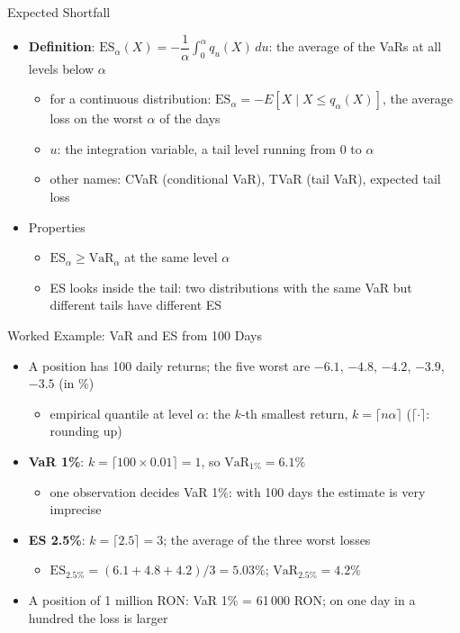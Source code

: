 \begin{frame}{Expected Shortfall}
\itemsize{\small}
\begin{itemize}
    \item \textbf{Definition}: $\mathrm{ES}_\alpha(X) = -\dfrac{1}{\alpha}\displaystyle\int_0^\alpha q_u(X)\,du$: the average of the VaRs at all levels below $\alpha$
    \begin{itemize}
        \item for a continuous distribution: $\mathrm{ES}_\alpha = -E[X \mid X \le q_\alpha(X)]$, the average loss on the worst $\alpha$ of the days
        \item $u$: the integration variable, a tail level running from 0 to $\alpha$
        \item other names: CVaR (conditional VaR), TVaR (tail VaR), expected tail loss
    \end{itemize}
    \item Properties
    \begin{itemize}
        \item $\mathrm{ES}_\alpha \ge \mathrm{VaR}_\alpha$ at the same level $\alpha$
        \item ES looks inside the tail: two distributions with the same VaR but different tails have different ES
    \end{itemize}
\end{itemize}
\end{frame}

\begin{frame}{Worked Example: VaR and ES from 100 Days}
\itemsize{\small}
\begin{itemize}
    \item A position has 100 daily returns; the five worst are $-6.1$, $-4.8$, $-4.2$, $-3.9$, $-3.5$ (in \%)
    \begin{itemize}
        \item empirical quantile at level $\alpha$: the $k$-th smallest return, $k = \lceil n\alpha \rceil$ ($\lceil\cdot\rceil$: rounding up)
    \end{itemize}
    \item \textbf{VaR 1\%}: $k = \lceil 100 \times 0.01 \rceil = 1$, so $\mathrm{VaR}_{1\%} = 6.1\%$
    \begin{itemize}
        \item one observation decides VaR 1\%: with 100 days the estimate is very imprecise
    \end{itemize}
    \item \textbf{ES 2.5\%}: $k = \lceil 2.5 \rceil = 3$; the average of the three worst losses
    \begin{itemize}
        \item $\mathrm{ES}_{2.5\%} = (6.1 + 4.8 + 4.2)/3 = 5.03\%$; $\mathrm{VaR}_{2.5\%} = 4.2\%$
    \end{itemize}
    \item A position of 1 million RON: VaR 1\% = 61\,000 RON; on one day in a hundred the loss is larger
\end{itemize}
\end{frame}

